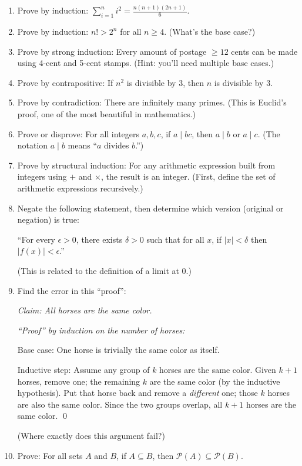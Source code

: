 \begin{enumerate}
  \item Prove by induction: $\displaystyle\sum_{i=1}^{n} i^2 = \frac{n(n+1)(2n+1)}{6}$.

  \item Prove by induction: $n! > 2^n$ for all $n \geq 4$. (What's the base case?)

  \item Prove by strong induction: Every amount of postage $\geq 12$ cents can be made using 4-cent and 5-cent stamps. (Hint: you'll need multiple base cases.)

  \item Prove by contrapositive: If $n^2$ is divisible by 3, then $n$ is divisible by 3.

  \item Prove by contradiction: There are infinitely many primes. (This is Euclid's proof, one of the most beautiful in mathematics.)

  \item Prove or disprove: For all integers $a, b, c$, if $a \mid bc$, then $a \mid b$ or $a \mid c$. (The notation $a \mid b$ means ``$a$ divides $b$.'')

  \item Prove by structural induction: For any arithmetic expression built from integers using $+$ and $\times$, the result is an integer. (First, define the set of arithmetic expressions recursively.)

  \item Negate the following statement, then determine which version (original or negation) is true:

  ``For every $\epsilon > 0$, there exists $\delta > 0$ such that for all $x$, if $|x| < \delta$ then $|f(x)| < \epsilon$.''

  (This is related to the definition of a limit at 0.)

  \item Find the error in this ``proof'':

  \emph{Claim: All horses are the same color.}

  \emph{``Proof'' by induction on the number of horses:}

  Base case: One horse is trivially the same color as itself. \checkmark

  Inductive step: Assume any group of $k$ horses are the same color. Given $k+1$ horses, remove one; the remaining $k$ are the same color (by the inductive hypothesis). Put that horse back and remove a \emph{different} one; those $k$ horses are also the same color. Since the two groups overlap, all $k+1$ horses are the same color. \qed

  (Where exactly does this argument fail?)

  \item Prove: For all sets $A$ and $B$, if $A \subseteq B$, then $\mathcal{P}(A) \subseteq \mathcal{P}(B)$.
\end{enumerate}
